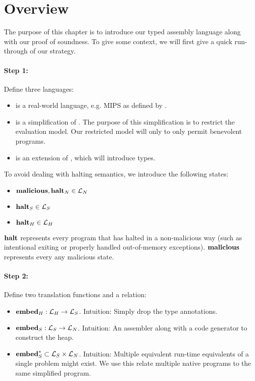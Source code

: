 \section{Overview}

The purpose of this chapter is to introduce our typed assembly language along
with our proof of soundness. To give some context, we will first give a quick
run-through of our strategy.

\paragraph{Step 1:} Define three languages:

\begin{itemize}
\item \nativelang is a real-world language, e.g. MIPS as defined by
  \cite{mipssys}.
\item \simplelang is a simplification of \nativelang. The purpose of
  this simplification is to restrict the evaluation model. Our restricted model
  will only to only permit benevolent programs.
\item \highlang is an extension of \simplelang, which will
  introduce types.
\end{itemize}

To avoid dealing with halting semantics, we introduce the following states:
\begin{itemize}
\item ${\mathbf{malicious}}, {\mathbf{halt}_N} \in \mathcal{L}_N$
\item ${\mathbf{halt}_S} \in \mathcal{L}_S$
\item ${\mathbf{halt}_H} \in \mathcal{L}_H$
\end{itemize}

${\mathbf{halt}}$ represents every program that has halted in a non-malicious way (such as
intentional exiting or properly handled out-of-memory exceptions). ${\mathbf{malicious}}$
represents every any malicious state.

\paragraph{Step 2:} Define two translation functions and a relation:

\begin{itemize}
\item ${{\mathbf{embed}}_H} : \mathcal{L}_H -> \mathcal{L}_S$. Intuition: Simply drop the type
  annotations.
\item ${{\mathbf{embed}}_S} : \mathcal{L}_S -> \mathcal{L}_N$. Intuition: An assembler
  along with a code generator to construct the heap.
\item ${\mathbf{embed}^\ast_S} \subset \mathcal{L}_S \times \mathcal{L}_N$. Intuition:
  Multiple equivalent run-time equivalents of a single problem might exist. We
  use this relate multiple native programs to the same simplified program.
\end{itemize}

